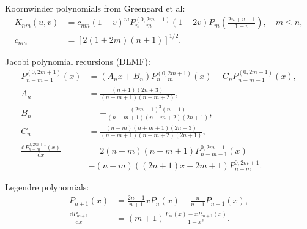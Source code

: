 \documentclass[a4paper,12pt]{article}
\newcommand{\D}{\mathrm{d}}
\begin{document}
Koornwinder polynomials from Greengard et al:
\begin{align}
  \label{equ:koornwinder:1}
  K_{nm}(u,v)
  &=
    c_{nm}(1-v)^{m}
    P_{n-m}^{(0,2m+1)}(1-2v)
    P_{m}
    \left(
    \frac{2u+v-1}{1-v}
  \right), \quad m\leq n,\\
  c_{nm} &=
  \left[
    2(1+2m)(n+1)
  \right]^{1/2}.
\end{align}

Jacobi polynomial recursions (DLMF):
\begin{align}
  \label{equ:jacobi:1}
  P_{n-m+1}^{(0,2m+1)}(x)
  &=
    (A_{n}x + B_{n})P_{n-m}^{(0,2m+1)}(x) -
    C_{n}P_{n-m-1}^{(0,2m+1)}(x),\\
  A_{n} &= \frac{(n+1)(2n+3)}{(n-m+1)(n+m+2)},\\
  B_{n} &= -\frac{(2m+1)^{2}(n+1)}{(n-m+1)(n+m+2)(2n+1)},\\
  C_{n} &= \frac{(n-m)(n+m+1)(2n+3)}{(n-m+1)(n+m+2)(2n+1)},\\
  \frac{\D P_{n-m}^{0,2m+1}(x)}{\D x}
  &=
  2(n-m)(n+m+1)P_{n-m-1}^{0,2m+1}(x) \nonumber\\
  &-
  (n-m)((2n+1)x + 2m+1)P_{n-m}^{0,2m+1}.
\end{align}

Legendre polynomials:
\begin{align}
  \label{equ:legendre}
  P_{n+1}(x)
  &=
  \frac{2n+1}{n+1}xP_{n}(x) - \frac{n}{n+1}P_{n-1}(x),\\
  \frac{\D P_{m+1}}{\D x}
  &=
  (m+1)\frac{P_{m}(x) - xP_{m+1}(x)}{1-x^{2}}.
\end{align}
\end{document}
